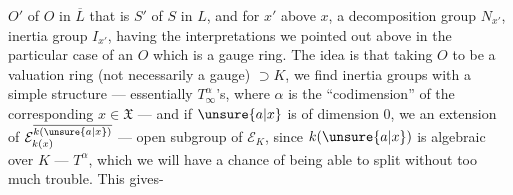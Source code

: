 $O'$ of $O$ in $\overline L$ that is $S'$ of $S$ in $L$, and for $x'$ above $x$, a decomposition group $N_{x'}$, inertia group $I_{x'}$, having the interpretations we pointed out above in the particular case of an $O$ which is a gauge ring. The idea is that taking $O$ to be a valuation ring (not necessarily a gauge) $\supset K$, we find inertia groups with a simple structure --- essentially $T_\infty^\alpha$'s, where $\alpha$ is the ``codimension'' of the corresponding $x\in\mathfrak X$ --- and if $\unsure{a|x}$ is of dimension 0, we  an extension of $\mathcal E_{k(x)}^{\overline{k(\unsure{a|x})}}$ --- open subgroup of $\mathcal E_K$, since $k(\unsure{a|x})$ is  algebraic over $K$ ---  $T^\alpha$, which we will have a chance of being able to split without too much trouble. This gives-
